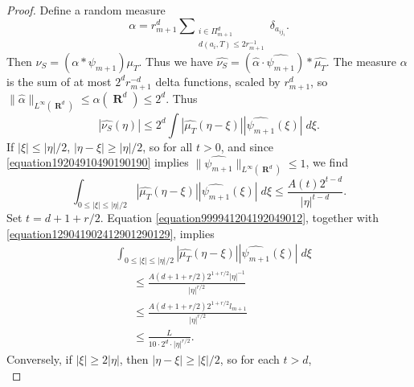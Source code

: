 \documentclass[12pt,reqno]{article}
\numberwithin{equation}{section}
\DeclareMathOperator{\RR}{\mathbf{R}}
\begin{document}
\begin{proof}
    Define a random measure
    \[ \alpha = r_{m+1}^d \sum\nolimits_{\substack{i \in \Pi_{m+1}^d\\d(a_i,T) \leq 2 r_{m+1}^{-1}}} \delta_{a_{ij_i}}. \]
    Then $\nu_S = (\alpha * \psi_{m+1}) \mu_T$.
    Thus we have $\widehat{\nu_S} = (\widehat{\alpha} \cdot \widehat{\psi_{m+1}}) * \widehat{\mu_T}$. The measure $\alpha$ is the sum of at most $2^d r_{m+1}^{-d}$ delta functions, scaled by $r_{m+1}^d$, so $\| \widehat{\alpha} \|_{L^\infty(\RR^d)} \leq \alpha(\RR^d) \leq 2^d$. Thus
    \begin{equation} \label{equation9942941924912912}
        |\widehat{\nu_S}(\eta)| \leq 2^d \int |\widehat{\mu_T}(\eta - \xi)| |\widehat{\psi_{m+1}}(\xi)|\; d\xi.
    \end{equation}
    If $|\xi| \leq |\eta|/2$, $|\eta - \xi| \geq |\eta|/2$, so for all $t > 0$, and since \eqref{equation19204910490190190} implies $\| \widehat{\psi_{m+1}} \|_{L^\infty(\RR^d)} \leq 1$, we find
    \begin{equation} \label{equation999941204192049012}
        \int_{0 \leq |\xi| \leq |\eta|/2} |\widehat{\mu_T}(\eta - \xi)| |\widehat{\psi_{m+1}}(\xi)|\; d\xi \leq \frac{A(t) 2^{t-d}}{|\eta|^{t-d}}.
    \end{equation}
    Set $t = d + 1 + r/2$. Equation \eqref{equation999941204192049012}, together with \eqref{equation129041902412901290129}, implies
    \begin{equation} \label{equation1111902491209012}
    \begin{split}
        &\int_{0 \leq |\xi| \leq |\eta|/2} |\widehat{\mu_T}(\eta - \xi)| |\widehat{\psi_{m+1}}(\xi)|\; d\xi\\
        &\ \ \ \ \ \ \ \leq \frac{A(d + 1 + r/2) 2^{1 + r/2} |\eta|^{-1}}{|\eta|^{r/2}}\\
        &\ \ \ \ \ \ \ \leq \frac{A(d + 1 + r/2) 2^{1 + r/2} l_{m+1}}{|\eta|^{r/2}}\\
        &\ \ \ \ \ \ \ \leq \frac{L}{10 \cdot 2^d \cdot |\eta|^{r/2}}.
    \end{split}
    \end{equation}
    Conversely, if $|\xi| \geq 2|\eta|$, then $|\eta - \xi| \geq |\xi|/2$, so for each $t > d$,
    \begin{equation} \label{equation5551092491022109}

\end{equation}
\end{proof}
\end{document}
